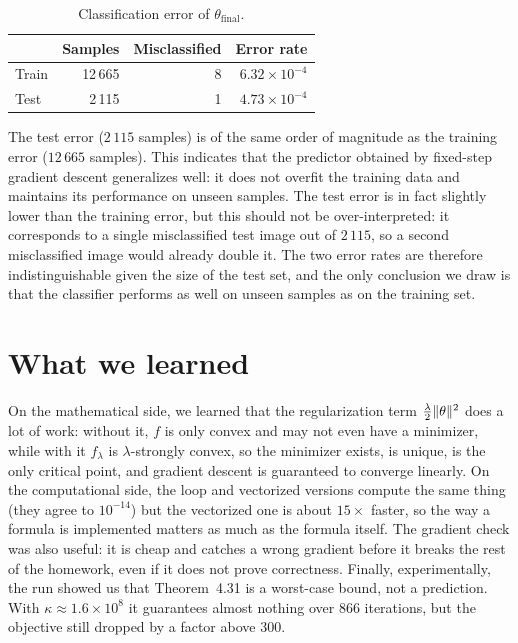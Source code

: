 \documentclass[a4paper,12pt]{article}
\DeclarePairedDelimiter{\norm}{\lVert}{\rVert}
\begin{document}
\begin{table}[H]\centering\small
\begin{tabular}{lrrr}
\toprule
 & Samples & Misclassified & Error rate \\
\midrule
Train & 12\,665 & 8 & $6.32\times10^{-4}$ \\
Test  & 2\,115  & 1 & $4.73\times10^{-4}$ \\
\bottomrule
\end{tabular}
\caption{Classification error of $\theta_{\mathrm{final}}$.}
\label{tab:q7}
\end{table}

The test error ($2\,115$ samples) is of the same order of magnitude as the training error ($12\,665$ samples). This indicates that the predictor obtained by fixed-step gradient descent generalizes well: it does not overfit the training data and maintains its performance on unseen samples. The test error is in fact slightly lower than the training error, but this should not be over-interpreted: it corresponds to a single misclassified test image out of $2\,115$, so a second misclassified image would already double it. The two error rates are therefore indistinguishable given the size of the test set, and the only conclusion we draw is that the classifier performs as well on unseen samples as on the training set.

% 
\section{What we learned}\label{sec:q8}
On the mathematical side, we learned that the regularization term $\tfrac{\lambda}{2}\norm{\theta}^2$ does a lot of work: without it, $f$ is only convex and may not even have a minimizer, while with it $f_\lambda$ is $\lambda$-strongly convex, so the minimizer exists, is unique, is the only critical point, and gradient descent is guaranteed to converge linearly. On the computational side, the loop and vectorized versions compute the same thing (they agree to $10^{-14}$) but the vectorized one is about $15\times$ faster, so the way a formula is implemented matters as much as the formula itself. The gradient check was also useful: it is cheap and catches a wrong gradient before it breaks the rest of the homework, even if it does not prove correctness. Finally, experimentally, the run showed us that Theorem~4.31 is a worst-case bound, not a prediction. With $\kappa \approx 1.6\times10^{8}$ it guarantees almost nothing over $866$ iterations, but the objective still dropped by a factor above $300$.
\end{document}
